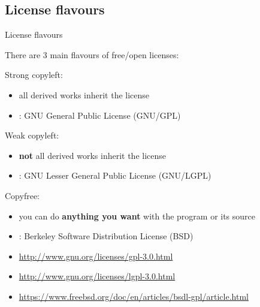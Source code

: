\documentclass[10pt,xcolor=svgnames]{beamer}
\begin{document}
\subsection{License flavours}
\begin{frame}[fragile]{License flavours}

    There are 3 main flavours of free/open licenses:
    \begin{block}{Strong copyleft:}
      \begin{itemize}
        \item all derived works inherit the license
        \item {}: GNU General Public License (GNU/GPL)
      \end{itemize}
    \end{block}
    
    \begin{block}{Weak copyleft:}
      \begin{itemize}
        \item \textbf{not} all derived works inherit the license
        \item {}: GNU Lesser General Public License (GNU/LGPL)
      \end{itemize}
    \end{block}
    
    \begin{block}{Copyfree:}
      \begin{itemize}
        \item you can do \textbf{anything you want} with the program or its source
        \item {}: Berkeley Software Distribution License (BSD)
      \end{itemize}
    \end{block}

  {\scriptsize
    \begin{itemize}
    \item \url{http://www.gnu.org/licenses/gpl-3.0.html}
    \item \url{http://www.gnu.org/licenses/lgpl-3.0.html}
    \item \url{https://www.freebsd.org/doc/en/articles/bsdl-gpl/article.html}
    \end{itemize}
  }
\end{frame}
\end{document}
